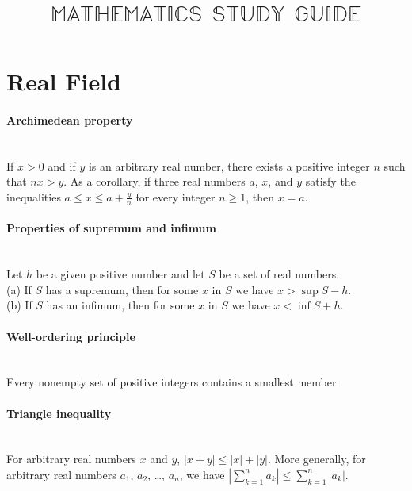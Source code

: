 \documentclass[10pt]{article}
\begin{document}
\setcounter{secnumdepth}{-1}

\title{$\mathbb{MATHEMATICS\ \ STUDY\ \ GUIDE}$}
\author{}
\date{}
\maketitle



\section{Real Field}\smallskip

\paragraph{Archimedean property}\ \\
If $x > 0$ and if $y$ is an arbitrary real number, there exists a positive integer $n$ such that $nx > y$.
As a corollary, if three real numbers $a$, $x$, and $y$ satisfy the inequalities $a \leq x \leq a + \frac{y}{n}$
for every integer $n \geq 1$, then $x = a$.

\paragraph{Properties of supremum and infimum}\ \\
Let $h$ be a given positive number and let $S$ be a set of real numbers.\\ 
(a) If $S$ has a supremum, then for some $x$ in $S$ we have $x > \sup S - h$.\\
(b) If $S$ has an infimum, then for some $x$ in $S$ we have $x < \inf S + h$.

\paragraph{Well-ordering principle}\ \\
Every nonempty set of positive integers contains a smallest member.

\paragraph{Triangle inequality}\ \\
For arbitrary real numbers $x$ and $y$, 
$|x + y| \leq |x| + |y|.$
More generally, for arbitrary real numbers $a_1$, $a_2$, \ldots, $a_n$, we have
$\left|\sum_{k=1}^n a_k\right| \leq \sum_{k=1}^n |a_k|.$
\end{document}
